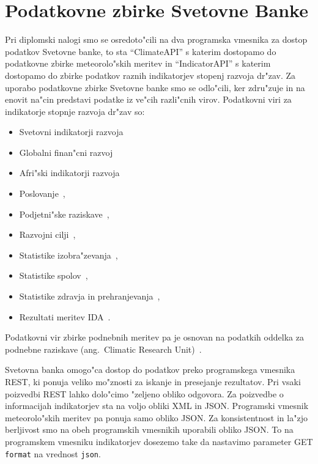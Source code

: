 \chapter{Podatkovne zbirke Svetovne Banke}

Pri diplomski nalogi smo se osredoto"cili na dva programska vmesnika za dostop 
podatkov Svetovne banke, to sta ``ClimateAPI'' s katerim dostopamo do 
podatkovne zbirke meteorolo"skih meritev in ``IndicatorAPI'' s katerim dostopamo do 
zbirke podatkov raznih indikatorjev stopenj razvoja dr"zav.
Za uporabo podatkovne zbirke Svetovne banke smo se odlo"cili, ker zdru"zuje in na
enovit na"cin predstavi podatke iz ve"cih razli"cnih virov. Podatkovni viri za 
indikatorje stopnje razvoja dr"zav so:
\begin{itemize}  
  \item Svetovni indikatorji razvoja~\cite{world_dev_ind} %
  \item Globalni finan"cni razvoj~\cite{glob_fin_dev}
  \item Afri"ski indikatorji razvoja~\cite{africa_dev_ind}
  \item Poslovanje~\cite{doing_buseness},
  \item Podjetni"ske raziskave~\cite{ent_surveys}, 
  \item Razvojni cilji~\cite{mil_dev_goals}, 
  \item Statistike izobra"zevanja~\cite{edu_stat}, 
  \item Statistike spolov~\cite{gen_stat},
  \item Statistike zdravja in prehranjevanja~\cite{health_pop_stat},
  \item Rezultati meritev IDA~\cite{ida_res_mes_sys}.
\end{itemize}  

Podatkovni vir zbirke podnebnih meritev pa je osnovan na podatkih oddelka
za podnebne raziskave (ang.\ Climatic Research Unit)~\cite{climate_data}.

Svetovna banka omogo"ca dostop do podatkov preko programskega vmesnika REST, ki
ponuja veliko mo"znosti za iskanje in presejanje rezultatov. Pri vsaki 
poizvedbi REST lahko dolo"cimo "zeljeno obliko odgovora. Za poizvedbe o 
informacijah indikatorjev sta na voljo obliki XML in JSON. Programski vmesnik 
meteorolo"skih meritev pa ponuja samo obliko JSON. Za konsistentnost in la"zjo
berljivost smo na obeh programskih vmesnikih uporabili obliko JSON. To na
programskem vmesniku indikatorjev dosezemo take da nastavimo parameter GET
\verb|format| na vrednost \verb|json|. 


